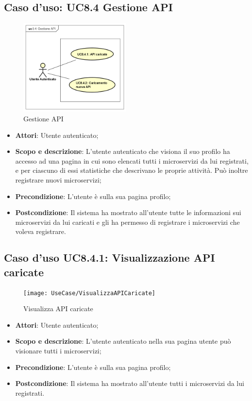 \documentclass[12pt,a4paper,titlepage]{article}
\begin{document}
	\subsection{Caso d'uso: UC8.4 Gestione API}
	\label{UC8.4}
	\begin{figure}[H]
		\centering
		\includegraphics[width=0.5\textwidth]{UseCase/GestioneAPI}
		\caption{Gestione API}
	\end{figure}
	\begin{itemize}
		\item \textbf{Attori}: Utente autenticato;
		\item \textbf{Scopo e descrizione}: L'utente autenticato che visiona il suo profilo ha accesso ad una pagina in cui sono elencati tutti i microservizi da lui registrati, e per ciascuno di essi statistiche che descrivano le proprie attività. Può inoltre registrare nuovi microservizi;
		\item \textbf{Precondizione}: L'utente è sulla sua pagina profilo;
		\item \textbf{Postcondizione}: Il sistema ha mostrato all'utente tutte le informazioni sui microservizi da lui caricati e gli ha permesso di registrare i microservizi che voleva registrare.
	\end{itemize}
	\subsection{Caso d'uso UC8.4.1: Visualizzazione API caricate}
	\label{UC8.4.1}
	\begin{figure}[H]
		\centering
		\texttt{[image: UseCase/VisualizzaAPICaricate]}
		\caption{Visualizza API caricate}
	\end{figure}
	\begin{itemize}
		\item \textbf{Attori}: Utente autenticato;
		\item \textbf{Scopo e descrizione}: L'utente autenticato nella sua pagina utente può visionare tutti i microservizi;
		\item \textbf{Precondizione}: L'utente è sulla sua pagina profilo;
		\item \textbf{Postcondizione}: Il sistema ha mostrato all'utente tutti i microservizi da lui registrati.
	\end{itemize}
\end{document}
